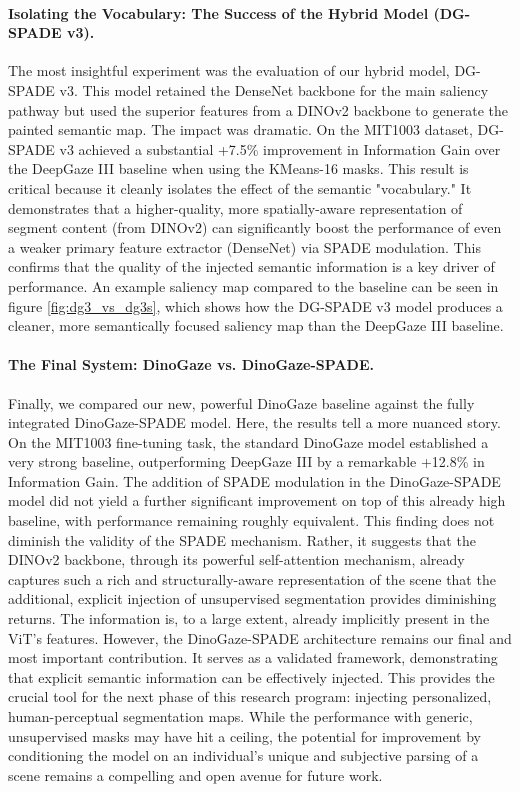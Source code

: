 \paragraph{Isolating the Vocabulary: The Success of the Hybrid Model (DG-SPADE v3).}
The most insightful experiment was the evaluation of our hybrid model, DG-SPADE v3. This model retained the DenseNet backbone for the main saliency pathway but used the superior features from a DINOv2 backbone to generate the painted semantic map. The impact was dramatic. On the MIT1003 dataset, DG-SPADE v3 achieved a substantial +7.5\% improvement in Information Gain over the DeepGaze III baseline when using the KMeans-16 masks. This result is critical because it cleanly isolates the effect of the semantic "vocabulary." It demonstrates that a higher-quality, more spatially-aware representation of segment content (from DINOv2) can significantly boost the performance of even a weaker primary feature extractor (DenseNet) via SPADE modulation. This confirms that the quality of the injected semantic information is a key driver of performance. An example saliency map compared to the baseline can be seen in figure \ref{fig:dg3_vs_dg3s}, which shows how the DG-SPADE v3 model produces a cleaner, more semantically focused saliency map than the DeepGaze III baseline.
\paragraph{The Final System: DinoGaze vs. DinoGaze-SPADE.}
Finally, we compared our new, powerful DinoGaze baseline against the fully integrated DinoGaze-SPADE model. Here, the results tell a more nuanced story. On the MIT1003 fine-tuning task, the standard DinoGaze model established a very strong baseline, outperforming DeepGaze III by a remarkable +12.8\% in Information Gain. The addition of SPADE modulation in the DinoGaze-SPADE model did not yield a further significant improvement on top of this already high baseline, with performance remaining roughly equivalent.
This finding does not diminish the validity of the SPADE mechanism. Rather, it suggests that the DINOv2 backbone, through its powerful self-attention mechanism, already captures such a rich and structurally-aware representation of the scene that the additional, explicit injection of unsupervised segmentation provides diminishing returns. The information is, to a large extent, already implicitly present in the ViT's features.
However, the DinoGaze-SPADE architecture remains our final and most important contribution. It serves as a validated framework, demonstrating that explicit semantic information can be effectively injected. This provides the crucial tool for the next phase of this research program: injecting personalized, human-perceptual segmentation maps. While the performance with generic, unsupervised masks may have hit a ceiling, the potential for improvement by conditioning the model on an individual's unique and subjective parsing of a scene remains a compelling and open avenue for future work.


